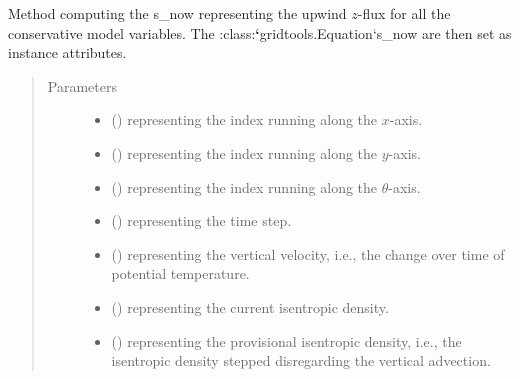 \documentclass[letterpaper,10pt,english]{sphinxmanual}
\begin{document}
\begin{fulllineitems}
\begin{fulllineitems}
\label{\detokenize{api:dycore.flux_isentropic_upwind.FluxIsentropicUpwind._compute_vertical_fluxes}}
Method computing the s\_now representing the upwind \(z\)-flux for all the conservative
model variables. The :class:{\color{red}\bfseries{}{}`}gridtools.Equation{}`s\_now are then set as instance attributes.
\begin{quote}\begin{description}
\item[{Parameters}] \leavevmode\begin{itemize}
\item {} 
 () \textendash{}  representing the index running along the \(x\)-axis.

\item {} 
 () \textendash{}  representing the index running along the \(y\)-axis.

\item {} 
 () \textendash{}  representing the index running along the \(\theta\)-axis.

\item {} 
 () \textendash{}  representing the time step.

\item {} 
 () \textendash{}  representing the vertical velocity, i.e., the change over time of potential temperature.

\item {} 
 () \textendash{}  representing the current isentropic density.

\item {} 
 () \textendash{}  representing the provisional isentropic density, i.e., the isentropic density stepped
disregarding the vertical advection.


\end{itemize}
\end{description}
\end{quote}
\end{fulllineitems}
\end{fulllineitems}
\end{document}
